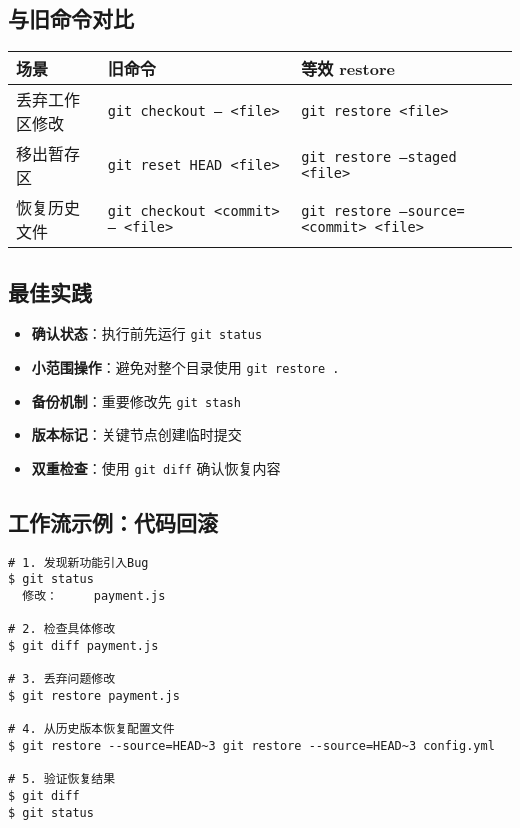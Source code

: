 \subsection{与旧命令对比}
\begin{center}
\begin{tabular}{@{}lll@{}}
    \toprule
    \textbf{场景} & \textbf{旧命令} & \textbf{等效 restore} \\
    \midrule
    丢弃工作区修改 & \texttt{git checkout -- <file>} & \texttt{git restore <file>} \\
    移出暂存区 & \texttt{git reset HEAD <file>} & \texttt{git restore --staged <file>} \\
    恢复历史文件 & \texttt{git checkout <commit> -- <file>} & \texttt{git restore --source=<commit> <file>} \\
    \bottomrule
\end{tabular}
\end{center}

\subsection{最佳实践}
\begin{itemize}[leftmargin=*, nosep]
    \item \textbf{确认状态}：执行前先运行 \texttt{git status}
    \item \textbf{小范围操作}：避免对整个目录使用 \texttt{git restore .}
    \item \textbf{备份机制}：重要修改先 \texttt{git stash}
    \item \textbf{版本标记}：关键节点创建临时提交
    \item \textbf{双重检查}：使用 \texttt{git diff} 确认恢复内容
\end{itemize}

\subsection{工作流示例：代码回滚}
\begin{verbatim}
# 1. 发现新功能引入Bug
$ git status
  修改：     payment.js

# 2. 检查具体修改
$ git diff payment.js

# 3. 丢弃问题修改
$ git restore payment.js

# 4. 从历史版本恢复配置文件
$ git restore --source=HEAD~3 git restore --source=HEAD~3 config.yml

# 5. 验证恢复结果
$ git diff
$ git status
\end{verbatim}


